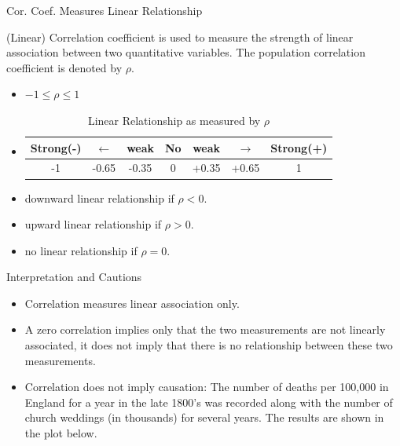 \documentclass[14pt]{beamer}\usepackage[]{graphicx}\usepackage[]{color}
\begin{document}
\begin{frame}[fragile]{Cor. Coef. Measures Linear Relationship}

(Linear) Correlation coefficient is used to measure the strength of linear  association between two quantitative variables. The population correlation  coefficient is denoted by $\rho$.

\begin{itemize}
\item<1-> $ -1 \le \rho \le 1 $
\item<2-> 

\begin{table}[ht]
{\footnotesize{
\caption{Linear Relationship as measured by $\rho$}
\begin{tabular}{@{} ccccccc @{}} \hline
Strong(-) & $\leftarrow$ & weak & No & weak & $\rightarrow$ & Strong(+) \\ \hline
-1 & -0.65 & -0.35 & 0 & +0.35 & +0.65 & 1 \\ \hline
\end{tabular}
}}
\end{table}

\item<3-> downward linear relationship if $\rho < 0$.
\item<4-> upward linear relationship if $\rho > 0$. 
\item<5-> no linear relationship if $\rho = 0$. 
\end{itemize}
\end{frame}

\begin{frame}[fragile]{Interpretation and Cautions}

\begin{itemize}
\item<1-> Correlation measures linear association only.
\item<2-> A zero correlation implies only that the two measurements are not  linearly associated, it does not imply that there is no relationship  between these two measurements.
\item<3> Correlation does not imply causation: The number of deaths per  100,000 in England for a year in the late 1800's was recorded along  with the number of church weddings (in thousands) for several years.  The results are shown in the plot below.
\end{itemize}
\end{frame}
\end{document}

